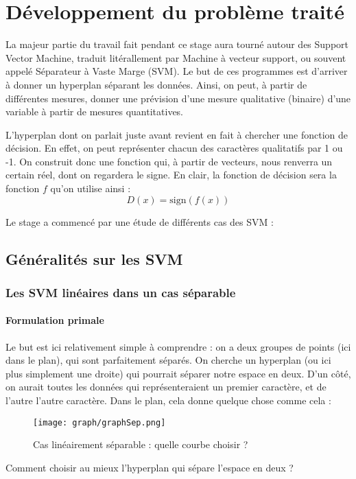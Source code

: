 \section{Développement du problème traité}
La majeur partie du travail fait pendant ce stage aura tourné autour des Support Vector Machine, traduit litérallement par Machine à vecteur support, ou souvent appelé Séparateur à Vaste Marge (SVM). Le but de ces programmes est d'arriver à donner un hyperplan séparant les données. Ainsi, on peut, à partir de différentes mesures, donner une prévision d'une mesure qualitative (binaire) d'une variable à partir de mesures quantitatives.

\bigskip
L'hyperplan dont on parlait juste avant revient en fait à chercher une fonction de décision. En effet, on peut représenter chacun des caractères qualitatifs par 1 ou -1. On construit donc une fonction qui, à partir de vecteurs, nous renverra un certain réel, dont on regardera le signe. En clair, la fonction de décision sera la fonction $f$ qu'on utilise ainsi :
\[D(x)=\text{sign}(f(x))\]

\bigskip
Le stage a commencé par une étude de différents cas des SVM :
\subsection{Généralités sur les SVM}
\subsubsection{Les SVM linéaires dans un cas séparable}
\paragraph{Formulation primale\\}

Le but est ici relativement simple à comprendre : on a deux groupes de points (ici dans le plan), qui sont parfaitement séparés. On cherche un hyperplan (ou ici plus simplement une droite) qui pourrait séparer notre espace en deux. D'un côté, on aurait toutes les données qui représenteraient un premier caractère, et de l'autre l'autre caractère. Dans le plan, cela donne quelque chose comme cela :
\begin{figure}[!h]
\centering
\texttt{[image: graph/graphSep.png]}
\caption{Cas linéairement séparable : quelle courbe choisir ?}
\label{linSep}
\end{figure}

\bigskip
Comment choisir au mieux l'hyperplan qui sépare l'espace en deux ?

